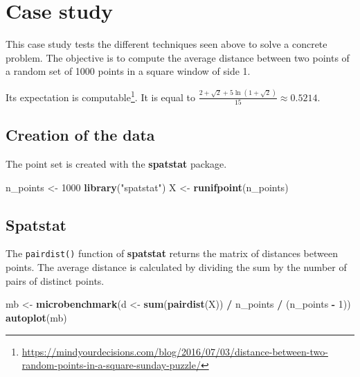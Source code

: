 \documentclass[
  12pt,
  american,
  a4paper,
  extrafontsizes,onecolumn,openright
  ]{memoir}
\newenvironment{Shaded}{\begin{snugshade}}{\end{snugshade}}
\newcommand{\DecValTok}[1]{\textcolor[rgb]{0.00,0.00,0.81}{#1}}
\newcommand{\FunctionTok}[1]{\textcolor[rgb]{0.13,0.29,0.53}{\textbf{#1}}}
\newcommand{\NormalTok}[1]{#1}
\newcommand{\OtherTok}[1]{\textcolor[rgb]{0.56,0.35,0.01}{#1}}
\newcommand{\SpecialCharTok}[1]{\textcolor[rgb]{0.81,0.36,0.00}{\textbf{#1}}}
\newcommand{\StringTok}[1]{\textcolor[rgb]{0.31,0.60,0.02}{#1}}
\begin{document}
\normalsize

\section{Case study}\label{sec:cas}

This case study tests the different techniques seen above to solve a concrete problem.
The objective is to compute the average distance between two points of a random set of 1000 points in a square window of side 1.

Its expectation is computable\footnote{\url{https://mindyourdecisions.com/blog/2016/07/03/distance-between-two-random-points-in-a-square-sunday-puzzle/}}.
It is equal to \(\frac{2+\sqrt{2}+5\ln{(1+\sqrt{2})}}{15} \approx 0.5214\).

\subsection{Creation of the data}\label{creation-of-the-data}

The point set is created with the \textbf{spatstat} package.

\scriptsize

\begin{Shaded}
\begin{Highlighting}[]
\NormalTok{n\_points }\OtherTok{\textless{}{-}} \DecValTok{1000}
\FunctionTok{library}\NormalTok{(}\StringTok{"spatstat"}\NormalTok{)}
\NormalTok{X }\OtherTok{\textless{}{-}} \FunctionTok{runifpoint}\NormalTok{(n\_points)}
\end{Highlighting}
\end{Shaded}

\normalsize

\subsection{Spatstat}\label{spatstat}

The \texttt{pairdist()} function of \textbf{spatstat} returns the matrix of distances between points.
The average distance is calculated by dividing the sum by the number of pairs of distinct points.

\scriptsize

\begin{Shaded}
\begin{Highlighting}[]
\NormalTok{mb }\OtherTok{\textless{}{-}} \FunctionTok{microbenchmark}\NormalTok{(d }\OtherTok{\textless{}{-}} \FunctionTok{sum}\NormalTok{(}\FunctionTok{pairdist}\NormalTok{(X)) }\SpecialCharTok{/}\NormalTok{ n\_points }\SpecialCharTok{/}\NormalTok{ (n\_points }\SpecialCharTok{{-}} \DecValTok{1}\NormalTok{))}
\FunctionTok{autoplot}\NormalTok{(mb)}
\end{Highlighting}
\end{Shaded}
\end{document}
